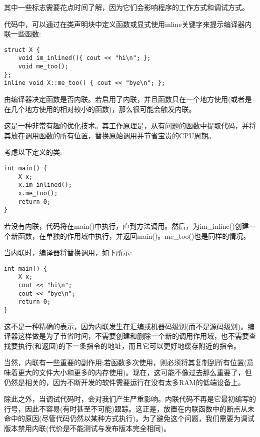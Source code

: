 其中一些标志需要花点时间了解，因为它们会影响程序的工作方式和调试方式。


代码中，可以通过在类声明块中定义函数或显式使用inline关键字来提示编译器内联一些函数:

\begin{lstlisting}[style=styleCXX]
struct X {
	void im_inlined(){ cout << "hi\n"; };
	void me_too();
};
inline void X::me_too() { cout << "bye\n"; };
\end{lstlisting} 

由编译器决定函数是否内联。若启用了内联，并且函数只在一个地方使用(或者是在几个地方使用的相对较小的函数)，那么很可能会触发内联。

这是一种非常有趣的优化技术。其工作原理是，从有问题的函数中提取代码，并将其放在调用函数的所有位置，替换原始调用并节省宝贵的CPU周期。

考虑以下定义的类:

\begin{lstlisting}[style=styleCXX]
int main() {
	X x;
	x.im_inlined();
	x.me_too();
	return 0;
}
\end{lstlisting} 

若没有内联，代码将在main()中执行，直到方法调用。然后，为im\_inline()创建一个新函数，在单独的作用域中执行，并返回main()。me\_too()也是同样的情况。

当内联时，编译器将替换调用，如下所示:

\begin{lstlisting}[style=styleCXX]
int main() {
	X x;
	cout << "hi\n";
	cout << "bye\n";
	return 0;
}
\end{lstlisting} 

这不是一种精确的表示，因为内联发生在汇编或机器码级别(而不是源码级别)。编译器这样做是为了节省时间，不需要创建和删除一个新的调用作用域，也不需要查找要执行(和返回)的下一条指令的地址，而且它可以更好地缓存附近的指令。

当然，内联有一些重要的副作用;若函数多次使用，则必须将其复制到所有位置(意味着更大的文件大小和更多的内存使用)。现在，这可能不像过去那么重要了，但仍然是相关的，因为不断开发的软件需要运行在没有太多RAM的低端设备上。

除此之外，当调试代码时，会对我们产生严重影响。内联代码不再是它最初编写的行号，因此不容易(有时甚至不可能)跟踪。这正是，放置在内联函数中的断点从未命中的原因(尽管代码仍然以某种方式执行)。为了避免这个问题，我们需要为调试版本禁用内联(代价是不能测试与发布版本完全相同)。

